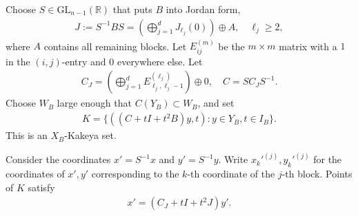 \documentclass[reqno,11pt]{amsart}
\numberwithin{equation}{section}
\numberwithin{figure}{section}
\def\R{\mathbb{R}}
\renewcommand\geq{\geqslant}
\theoremstyle{plain}
\theoremstyle{definition}
\begin{document}
    Choose $S \in \mathrm{GL}_{n-1}(\R)$ that puts $B$ into Jordan form, 
    \begin{align}
        J :=S^{-1}BS = ( \bigoplus_{j=1}^d J_{\ell_j}(0)) \oplus A, \quad \ell_j \geq 2,
    \end{align}
    where $A$ contains all remaining blocks. Let $E_{ij}^{(m)}$ be the $m \times m$ matrix with a $1$ in the $(i,j)$-entry and $0$ everywhere else. Let 
    \begin{align}
        C_J = ( \bigoplus_{j=1}^d E_{\ell_j, \ell_j-1}^{(\ell_j)}) \oplus 0, \quad C=SC_J S^{-1}.
    \end{align}
    Choose $W_B$ large enough that $C(Y_B) \subset W_B$, and set 
    \begin{align}
        K = \{((C+tI + t^2 B)y,t) : y \in Y_B, t \in I_B\}.
    \end{align}
    This is an $X_B$-Kakeya set.

    Consider the coordinates $x' = S^{-1}x$ and $y' = S^{-1}y$. Write $x_{k}'^{(j)}, y_{k}'^{(j)}$ for the coordinates of $x',y'$ corresponding to the $k$-th coordinate of the $j$-th block. Points of $K$ satisfy 
    \begin{align}
        x' = (C_J + tI + t^2 J)y'.
    \end{align}
\end{document}
